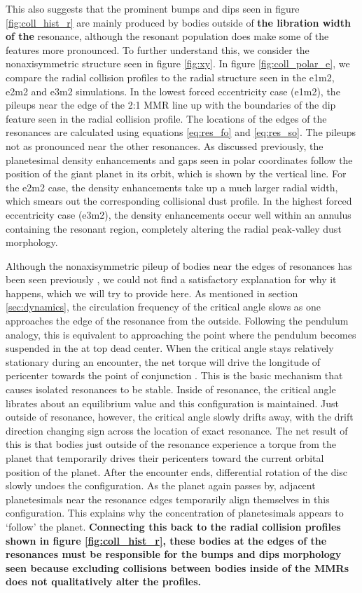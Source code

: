 \documentclass[fleqn,usenatbib]{mnras}
\begin{document}
This also suggests that the prominent bumps and dips seen in figure \ref{fig:coll_hist_r} are mainly produced by bodies outside of \textbf{the libration width of the} resonance, although 
the resonant population does make some of the features more pronounced. To further understand this, we consider the nonaxisymmetric structure 
seen in figure \ref{fig:xy}. In figure \ref{fig:coll_polar_e}, we compare the radial collision profiles to the radial structure seen in the e1m2, e2m2 and 
e3m2 simulations. In the lowest forced eccentricity case (e1m2), the pileups near the edge of the 2:1 MMR line up with the boundaries of the dip 
feature seen in the radial collision profile. The locations of the edges of the resonances are calculated using equations \ref{eq:res_fo} and 
\ref{eq:res_so}. The pileups not as pronounced near the other resonances. As discussed previously, the planetesimal density enhancements and gaps 
seen in polar coordinates follow the position of the giant planet in its orbit, which is shown by the vertical line. For the e2m2 case, the density 
enhancements take up a much larger radial width, which smears out the corresponding collisional dust profile. In the highest forced eccentricity case 
(e3m2), the density enhancements occur well within an annulus containing the resonant region, completely altering the radial peak-valley dust 
morphology.

Although the nonaxisymmetric pileup of bodies near the edges of resonances has been seen previously 
\citep{2000Icar..143...45R, 2016ApJ...818..159T}, we could not find a satisfactory explanation for why it happens, which we will try to provide here. As 
mentioned in section \ref{sec:dynamics}, the circulation frequency of the critical angle slows as one approaches the edge of the resonance from the 
outside. Following the pendulum analogy, this is equivalent to
approaching the point where the pendulum becomes suspended in the
at top dead center. 
When the critical angle stays relatively stationary during an encounter, the net torque will drive the longitude of pericenter towards the point of 
conjunction \citep{1976ARA&A..14..215P}.  This is the basic mechanism that causes isolated resonances to be stable. Inside of resonance, the critical 
angle librates about an equilibrium value and this configuration is maintained. Just outside of resonance, however, the critical angle slowly drifts away, with the 
drift direction changing sign across the location of exact resonance. The net result of this is that bodies just outside of the resonance experience a torque from 
the planet that temporarily drives their pericenters toward the current orbital position of the planet. After the encounter ends, differential rotation of the disc 
slowly undoes the configuration. As the planet again passes by, adjacent planetesimals near the resonance edges temporarily align 
themselves in this configuration. This explains why the concentration of planetesimals appears to `follow' the planet. \textbf{Connecting this back to the radial collision profiles shown in 
figure \ref{fig:coll_hist_r}, these bodies at the edges of the resonances must be responsible for the bumps and dips morphology seen because excluding collisions between bodies inside 
of the MMRs does not qualitatively alter the profiles.}
\end{document}
